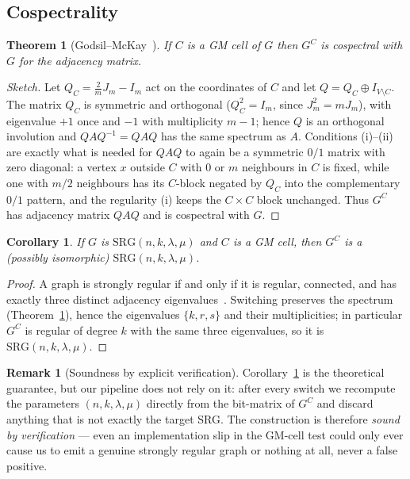 \documentclass[11pt]{article}
\newtheorem{theorem}{Theorem}
\newtheorem{corollary}{Corollary}
\theoremstyle{definition}
\newtheorem{remark}{Remark}
\newcommand{\SRG}[1]{\mathrm{SRG}(#1)}
\begin{document}
\subsection{Cospectrality}

\begin{theorem}[Godsil--McKay~\cite{gm1982}]\label{thm:gm}
If $C$ is a GM cell of $G$ then $G^{C}$ is cospectral with $G$ for the adjacency matrix.
\end{theorem}

\begin{proof}[Sketch]
Let $Q_C = \tfrac{2}{m}J_m - I_m$ act on the coordinates of $C$ and let $Q = Q_C \oplus
I_{V\setminus C}$. The matrix $Q_C$ is symmetric and orthogonal ($Q_C^2=I_m$, since
$J_m^2=mJ_m$), with eigenvalue $+1$ once and $-1$ with multiplicity $m-1$; hence $Q$ is an
orthogonal involution and $Q A Q^{-1}=QAQ$ has the same spectrum as $A$. Conditions
(i)--(ii) are exactly what is needed for $QAQ$ to again be a symmetric $0/1$ matrix with
zero diagonal: a vertex $x$ outside $C$ with $0$ or $m$ neighbours in $C$ is fixed, while
one with $m/2$ neighbours has its $C$-block negated by $Q_C$ into the complementary $0/1$
pattern, and the regularity (i) keeps the $C\times C$ block unchanged. Thus
$G^{C}$ has adjacency matrix $QAQ$ and is cospectral with $G$.
\end{proof}

\begin{corollary}\label{cor:stillsrg}
If $G$ is $\SRG{n,k,\lambda,\mu}$ and $C$ is a GM cell, then $G^{C}$ is a (possibly
isomorphic) $\SRG{n,k,\lambda,\mu}$.
\end{corollary}

\begin{proof}
A graph is strongly regular if and only if it is regular, connected, and has exactly
three distinct adjacency eigenvalues~\cite{bvm-srg}. Switching preserves the spectrum
(Theorem~\ref{thm:gm}), hence the eigenvalues $\{k,r,s\}$ and their multiplicities; in
particular $G^{C}$ is regular of degree $k$ with the same three eigenvalues, so it is
$\SRG{n,k,\lambda,\mu}$.
\end{proof}

\begin{remark}[Soundness by explicit verification]\label{rem:verify}
Corollary~\ref{cor:stillsrg} is the theoretical guarantee, but our pipeline does not rely
on it: after every switch we recompute the parameters $(n,k,\lambda,\mu)$ directly from
the bit-matrix of $G^{C}$ and discard anything that is not exactly the target SRG. The
construction is therefore \emph{sound by verification} --- even an implementation slip in
the GM-cell test could only ever cause us to emit a genuine strongly regular graph or
nothing at all, never a false positive.
\end{remark}
\end{document}
